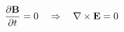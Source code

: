 \documentclass[preview]{standalone}
\begin{document}
\begin{align*}
\special{dvisvgm:raw <g id='unique000'>}\frac{\partial\mathbf B}{\partial t}=0\quad\Rightarrow\quad\nabla\times\mathbf E=0\special{dvisvgm:raw </g>}
\end{align*}
\end{document}

